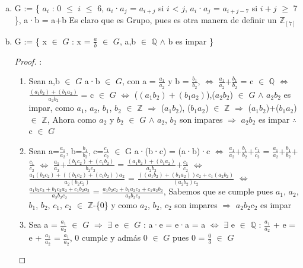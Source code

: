 \documentclass[10pt,a4paper,oneside]{article}
\begin{document}
\begin{enumerate}[a)]
\begin{proof}
\begin{enumerate}[1.]
						\end{enumerate}
						$\therefore$ G no es un Grupo
					\end{proof}.
				\newline
				\item G := \{ $a_{i}$ : 0 $\leq$ $i$ $\leq$ 6, $a_i$·$a_j$ = $a_{i+j}$ si $i$ < $j$, $a_i$·$a_j$ = $a_{i+j-7}$ si $i+j$ $\geq$ 7 \}, a·b = a+b
					\newline
					Es claro que es Grupo, pues es otra manera de definir un $\mathbb{Z}_{[7]}$
				\newline
				\item G := \{ x $\in$ $G$ : x = $\frac{a}{b}$ $\in$ $G$, a,b $\in$ $\mathbb{Q}$ $\wedge$ b es impar  \}
					\newline
					\begin{proof}:
						\newline
						\begin{enumerate}[1.]
							\item Sean a,b $\in$ $G$ a·b $\in$ $G$, con a = $\frac{a_1}{a_2}$ y b = $\frac{b_1}{b_2}$, $\iff$ $\frac{a_1}{a_2}$+$\frac{b_1}{b_2}$ = c $\in$ $\mathbb{Q}$ $\iff$ $\frac{(a_1b_2)+(b_1a_2)}{a_2b_2}$ = c $\in$ $G$ $\iff$ ($(a_1b_2)+(b_1a_2)$),($a_2b_2$) $\in$ $G$ $\wedge$ $a_2b_2$ es impar, como $a_1$, $a_2$, $b_1$, $b_2$ $\in$ $\mathbb{Z}$ $\Rightarrow$ ($a_1b_2$), ($b_1a_2$) $\in$ $\mathbb{Z}$ $\Rightarrow$ ($a_1b_2$)+($b_1a_2$) $\in$ $\mathbb{Z}$, Ahora como $a_2$ y $b_2$ $\in$ $G$ $\wedge$ $a_2$, $b_2$ son impares $\Rightarrow$ $a_2$$b_2$ es impar $\therefore$ c $\in$ $G$
							\newline
							\item Sean a=$\frac{a_1}{a_2}$, b=$\frac{b_1}{b_2}$, c=$\frac{c_1}{c_2}$ $\in$ G a·(b·c) = (a·b)·c 
							$\iff$
							 $\frac{a_1}{a_2}$+$\frac{b_1}{b_2}$+$\frac{c_1}{c_2}$ = $\frac{a_1}{a_2}$+$\frac{b_1}{b_2}$+$\frac{c_1}{c_2}$ 
							 $\iff$ 
							 $\frac{a_1}{a_2}$+$\frac{(b_1c_2) + (c_1b_2)}{b_2c_2}$ = $\frac{(a_1b_2) + (b_1a_2)}{a_2b_2}$+$\frac{c_1}{c_2}$ 
							 $\iff$ 
							 $\frac{a_1(b_2c_2) + ((b_1c_2) + (c_1b_2))a_2}{a_2(b_2c_2)}$ = $\frac{((a_1b_2) + (b_1a_2))c_2 + c_1(a_2b_2)}{(a_2b_2)c_2}$ 
							 $\iff$
							 $\frac{a_1b_2c_2 + b_1c_2a_2 + c_1b_2a_2}{a_2b_2c_2}$ = $\frac{a_1b_2c_2 + b_1a_2c_2 + c_1a_2b_2}{a_2b_2c_2}$, Sabemos que se cumple pues $a_1$, $a_2$, $b_1$, $b_2$, $c_1$, $c_2$ $\in$ $\mathbb{Z}$-\{0\} y como $a_2$, $b_2$, $c_2$ son impares $\Rightarrow$ $a_2b_2c_2$ es impar
							 \newline
							 \item Sea a = $\frac{a_1}{a_2}$ $\in$ $G$ $\Rightarrow$ $\exists$ e $\in$ $G$ : a·e = e·a = a $\iff$ $\exists$ e $\in$ $\mathbb{Q}$ : $\frac{a_1}{a_2}$ + e = e + $\frac{a_1}{a_2}$ = $\frac{a_1}{a_2}$, 0 cumple y admás 0 $\in$ $G$ pues 0 = $\frac{0}{3}$ $\in$ $G$
$$
\end{enumerate}
\end{proof}
\end{enumerate}
\end{document}
